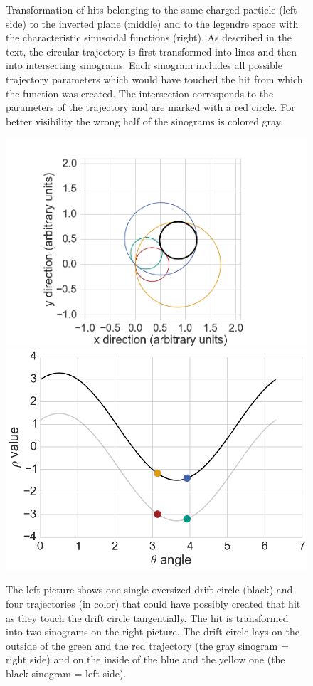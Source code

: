 \begin{figure}
 \caption[Axial legendre algorithm.]{Transformation of hits belonging to the same charged particle (left side) to the inverted plane (middle) and to the legendre space with the characteristic sinusoidal functions (right). As described in the text, the circular trajectory is first transformed into lines and then into intersecting sinograms. Each sinogram includes all possible trajectory parameters which would have touched the hit from which the function was created. The intersection corresponds to the parameters of the trajectory and are marked with a red circle. For better visibility the wrong half of the sinograms is colored gray.}
 \label{fig-legendre-explained}
\end{figure}

\begin{figure}
  \centering
  \includegraphics[scale=0.2]{figures/theory/sinosodial_1.png}
  \includegraphics[scale=0.2]{figures/theory/sinosodial_2.png}
  \caption[Sinograms in the legendre algorithm.]{The left picture shows one single oversized drift circle (black) and four trajectories (in color) that could have possibly created that hit as they touch the drift circle tangentially. The hit is transformed into two sinograms on the right picture. The drift circle lays on the outside of the green and the red trajectory (the gray sinogram = right side) and on the inside of the blue and the yellow one (the black sinogram = left side).}
  \label{fig-sinosodial}
\end{figure}


